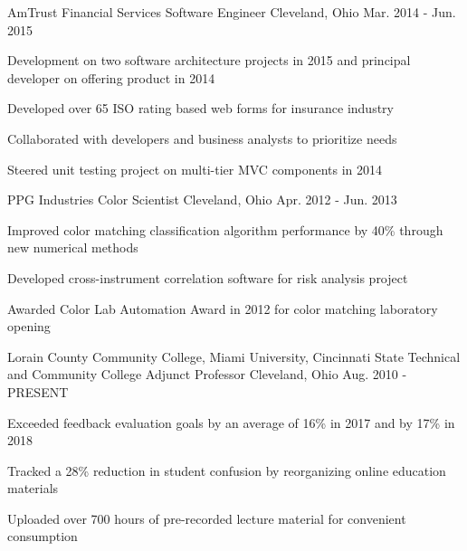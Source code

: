 \begin{cventries}
  \cventry
    {AmTrust Financial Services} %
    {Software Engineer} %
    {Cleveland, Ohio} %
    {Mar. 2014 - Jun. 2015} %
    {
      \begin{cvitems} %
        \item {Development on two software architecture projects in 2015 and principal developer on offering product in 2014}
        \item {Developed over 65 ISO rating based web forms for insurance industry}
        \item {Collaborated with developers and business analysts to prioritize needs}
        \item {Steered unit testing project on multi-tier MVC components in 2014}
      \end{cvitems}
    }

  \cventry
    {PPG Industries} %
    {Color Scientist} %
    {Cleveland, Ohio} %
    {Apr. 2012 - Jun. 2013} %
    {
      \begin{cvitems} %
        \item {Improved color matching classification algorithm performance by 40\% through new numerical methods}
        \item {Developed cross-instrument correlation software for risk analysis project}
        \item {Awarded Color Lab Automation Award in 2012 for color matching laboratory opening}
      \end{cvitems}
    }

  \cventry
    {Lorain County Community College, Miami University, Cincinnati State Technical and Community College} %
    {Adjunct Professor} %
    {Cleveland, Ohio} %
    {Aug. 2010 - PRESENT} %
    {
      \begin{cvitems} %
        \item {Exceeded feedback evaluation goals by an average of 16\% in 2017 and by 17\% in 2018}
        \item {Tracked a 28\% reduction in student confusion by reorganizing online education materials}
        \item {Uploaded over 700 hours of pre-recorded lecture material for convenient consumption}
      \end{cvitems}
    }


\end{cventries}
